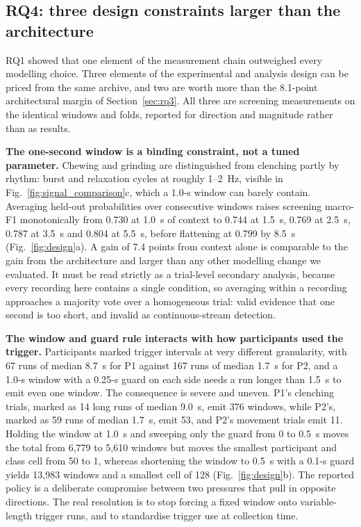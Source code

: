 \documentclass[pdflatex,sn-nature,iicol]{sn-jnl}
\begin{document}
\subsection{RQ4: three design constraints larger than the architecture}
\label{sec:constraints}

RQ1 showed that one element of the measurement chain outweighed every modelling choice. Three elements of the experimental and analysis design can be priced from the same archive, and two are worth more than the 8.1-point architectural margin of Section~\ref{sec:rq3}. All three are screening measurements on the identical windows and folds, reported for direction and magnitude rather than as results.

\textbf{The one-second window is a binding constraint, not a tuned parameter.} Chewing and grinding are distinguished from clenching partly by rhythm: burst and relaxation cycles at roughly 1--2~Hz, visible in Fig.~\ref{fig:signal_comparison}c, which a 1.0-s window can barely contain. Averaging held-out probabilities over consecutive windows raises screening macro-F1 monotonically from 0.730 at 1.0~s of context to 0.744 at 1.5~s, 0.769 at 2.5~s, 0.787 at 3.5~s and 0.804 at 5.5~s, before flattening at 0.799 by 8.5~s (Fig.~\ref{fig:design}a). A gain of 7.4 points from context alone is comparable to the gain from the architecture and larger than any other modelling change we evaluated. It must be read strictly as a trial-level secondary analysis, because every recording here contains a single condition, so averaging within a recording approaches a majority vote over a homogeneous trial: valid evidence that one second is too short, and invalid as continuous-stream detection.

\textbf{The window and guard rule interacts with how participants used the trigger.} Participants marked trigger intervals at very different granularity, with 67 runs of median 8.7~s for P1 against 167 runs of median 1.7~s for P2, and a 1.0-s window with a 0.25-s guard on each side needs a run longer than 1.5~s to emit even one window. The consequence is severe and uneven. P1's clenching trials, marked as 14 long runs of median 9.0~s, emit 376 windows, while P2's, marked as 59 runs of median 1.7~s, emit 53, and P2's movement trials emit 11. Holding the window at 1.0~s and sweeping only the guard from 0 to 0.5~s moves the total from 6,779 to 5,610 windows but moves the smallest participant and class cell from 50 to 1, whereas shortening the window to 0.5~s with a 0.1-s guard yields 13,983 windows and a smallest cell of 128 (Fig.~\ref{fig:design}b). The reported policy is a deliberate compromise between two pressures that pull in opposite directions. The real resolution is to stop forcing a fixed window onto variable-length trigger runs, and to standardise trigger use at collection time.
\end{document}
